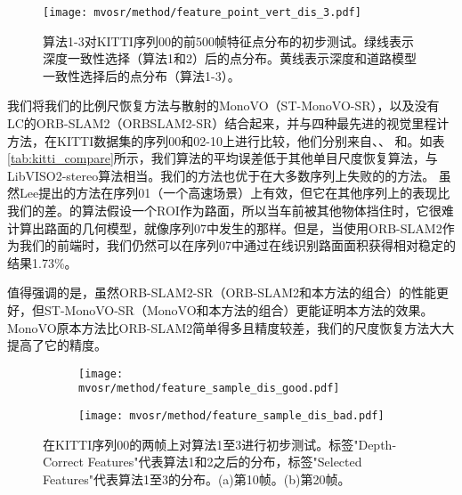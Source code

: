 \label{sec:overall_evaluation}
\begin{figure}[t]
    \centering
    \texttt{[image: mvosr/method/feature\_point\_vert\_dis\_3.pdf]}
    \caption{算法1-3对KITTI序列00的前500帧特征点分布的初步测试。绿线表示深度一致性选择（算法1和2）后的点分布。黄线表示深度和道路模型一致性选择后的点分布（算法1-3）。}
    \label{fig:GlobalDistribution}
\end{figure}
我们将我们的比例尺恢复方法与散射的MonoVO（ST-MonoVO-SR），以及没有LC的ORB-SLAM2（ORBSLAM2-SR）结合起来，并与四种最先进的视觉里程计方法，在KITTI数据集的序列00和02-10上进行比较，他们分别来自\cite{Song2015MoncularScale}、\cite{Geiger2011IV}、
\cite{Lee2015MoncularScale}和\cite{zhou2016reliable}。如表\ref{tab:kitti_compare}所示，我们算法的平均误差低于其他单目尺度恢复算法，与LibVISO2-stereo算法相当。我们的方法也优于在大多数序列上失败的\cite{zhou2016reliable}的方法。
虽然Lee\cite{Lee2015MoncularScale}提出的方法在序列01（一个高速场景）上有效，但它在其他序列上的表现比我们的差。\cite{Song2015MoncularScale}的算法假设一个ROI作为路面，所以当车前被其他物体挡住时，它很难计算出路面的几何模型，就像序列07中发生的那样。但是，当使用ORB-SLAM2作为我们的前端时，我们仍然可以在序列07中通过在线识别路面面积获得相对稳定的结果1.73\%。

值得强调的是，虽然ORB-SLAM2-SR（ORB-SLAM2和本方法的组合）的性能更好，但ST-MonoVO-SR（MonoVO和本方法的组合）更能证明本方法的效果。MonoVO原本方法比ORB-SLAM2简单得多且精度较差，我们的尺度恢复方法大大提高了它的精度。

\begin{figure}[t]
    \centering
    \begin{subfigure}[c]{0.95\textwidth}
    \texttt{[image: mvosr/method/feature\_sample\_dis\_good.pdf]}
    \caption{}
    \end{subfigure}
    \begin{subfigure}[c]{0.95\textwidth}
    \texttt{[image: mvosr/method/feature\_sample\_dis\_bad.pdf]}
    \caption{}
    \end{subfigure}
    \caption{在KITTI序列00的两帧上对算法1至3进行初步测试。标签"Depth-Correct Features"代表算法1和2之后的分布，标签"Selected Features"代表算法1至3的分布。(a)第10帧。(b)第20帧。}  
\end{figure}

